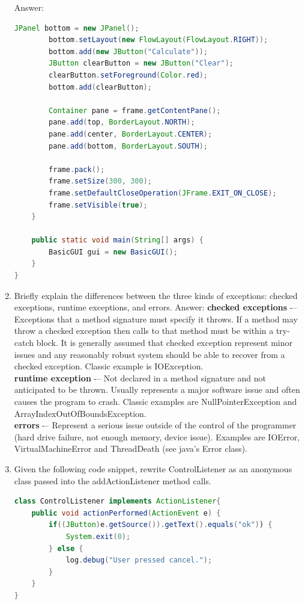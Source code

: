 \documentclass[11pt]{article}
\newenvironment{answer}{\large\lstset{basicstyle=\large\ttfamily}\color{white} \small{Answer:}}{}
\newenvironment{answer}{\large\lstset{basicstyle=\large\ttfamily}\color{red} \small{Answer:}}{}
\begin{document}
\begin{enumerate}
\begin{answer}
\begin{lstlisting}[language=java]
		JPanel bottom = new JPanel();
		bottom.setLayout(new FlowLayout(FlowLayout.RIGHT));
		bottom.add(new JButton("Calculate"));
		JButton clearButton = new JButton("Clear");
		clearButton.setForeground(Color.red);
		bottom.add(clearButton);
		
		Container pane = frame.getContentPane();
		pane.add(top, BorderLayout.NORTH);
		pane.add(center, BorderLayout.CENTER);
		pane.add(bottom, BorderLayout.SOUTH);
		
		frame.pack();
		frame.setSize(300, 300);
		frame.setDefaultCloseOperation(JFrame.EXIT_ON_CLOSE);
		frame.setVisible(true);
	}
	
	public static void main(String[] args) {
		BasicGUI gui = new BasicGUI();
	}
}
\end{lstlisting}
\end{answer}



\item Briefly explain the differences between the three kinds of exceptions: checked exceptions, runtime exceptions, and errors.
\begin{answer}
\textbf{checked exceptions} -– Exceptions that a method signature must specify it throws. If a method
may throw a checked exception then calls to that method must be within a try-catch block. It
is generally assumed that checked exception represent minor issues and any reasonably robust
system should be able to recover from a checked exception. Classic example is IOException.\\

\textbf{runtime exception} -– Not declared in a method signature and not anticipated to be thrown.
Usually represents a major software issue and often causes the program to crash. Classic
examples are NullPointerException and ArrayIndexOutOfBoundsException.\\

\textbf{errors} -– Represent a serious issue outside of the control of the programmer (hard drive
failure, not enough memory, device issue). Examples are IOError, VirtualMachineError and
ThreadDeath (see java's Error class).
\end{answer}



\item Given the following code snippet, rewrite ControlListener as an anonymous class passed into the addActionListener method calls.  
\begin{lstlisting}[language=java]
class ControlListener implements ActionListener{
	public void actionPerformed(ActionEvent e) {
		if((JButton)e.getSource()).getText().equals("ok")) {
			System.exit(0);
		} else {
			log.debug("User pressed cancel.");
		}
	}
}


\end{lstlisting}
\end{enumerate}
\end{document}
